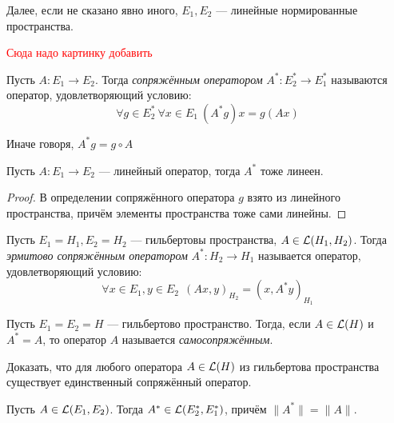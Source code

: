 \begin{note}
	Далее, если не сказано явно иного, $E_1, E_2$ --- линейные нормированные пространства.
\end{note}

\textcolor{red}{Сюда надо картинку добавить}

\begin{definition}
	Пусть $A \colon E_1 \to E_2$. Тогда \textit{сопряжённым оператором} $A^* \colon E_2^* \to E_1^*$ называются оператор, удовлетворяющий условию:
	\[
		\forall g \in E_2^*\ \forall x \in E_1\ (A^*g)x = g(Ax)
	\]
\end{definition}

\begin{anote}
	Иначе говоря, $A^*g = g \circ A$
\end{anote}

\begin{proposition}
	Пусть $A \colon E_1 \to E_2$ --- линейный оператор, тогда $A^*$ тоже линеен.
\end{proposition}

\begin{proof}
	В определении сопряжённого оператора $g$ взято из линейного пространства, причём элементы пространства тоже сами линейны.
\end{proof}

\begin{definition}
	Пусть $E_1 = H_1, E_2 = H_2$ --- гильбертовы пространства, $A \in \mathcal{L}(H_1, H_2)$. Тогда \textit{эрмитово сопряжённым оператором} $A^* \colon H_2 \to H_1$ называется оператор, удовлетворяющий условию:
	\[
		\forall x \in E_1, y \in E_2\ \ (Ax, y)_{H_2} = (x, A^*y)_{H_1}
	\]
\end{definition}

\begin{definition}
	Пусть $E_1 = E_2 = H$ --- гильбертово пространство. Тогда, если $A \in \mathcal{L}(H)$ и $A^* = A$, то оператор $A$ называется \textit{самосопряжённым}.
\end{definition}

\begin{exercise}
	Доказать, что для любого оператора $A \in \mathcal{L}(H)$ из гильбертова пространства существует единственный сопряжённый оператор.
\end{exercise}

\begin{theorem}
	Пусть $A \in \mathcal{L}(E_1, E_2)$. Тогда $A^* \in \mathcal{L}(E_2^*, E_1^*)$, причём $\|A^*\| = \|A\|$.
\end{theorem}

